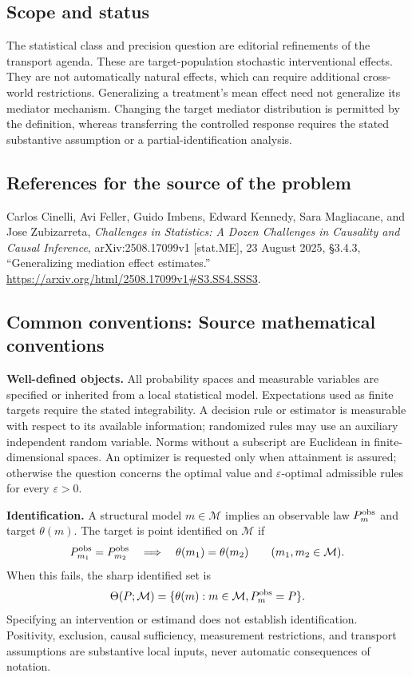\documentclass[11pt,a4paper]{article}
\begin{document}
\subsection*{Scope and status}
The statistical class and precision question are editorial refinements of the transport agenda. These are target-population stochastic interventional effects. They are not automatically natural effects, which can require additional cross-world restrictions. Generalizing a treatment's mean effect need not generalize its mediator mechanism. Changing the target mediator distribution is permitted by the definition, whereas transferring the controlled response requires the stated substantive assumption or a partial-identification analysis.
\subsection*{References for the source of the problem}
Carlos Cinelli, Avi Feller, Guido Imbens, Edward Kennedy, Sara Magliacane, and Jose Zubizarreta, \emph{Challenges in Statistics: A Dozen Challenges in Causality and Causal Inference}, arXiv:2508.17099v1 [stat.ME], 23 August 2025, \S3.4.3, ``Generalizing mediation effect estimates.'' \url{https://arxiv.org/html/2508.17099v1#S3.SS4.SSS3}.

\subsection*{Common conventions: Source mathematical conventions}

\textbf{Well-defined objects.}
All probability spaces and measurable variables are specified or inherited
from a local statistical model. Expectations used as finite targets require
the stated integrability. A decision rule or estimator is measurable with
respect to its available information; randomized rules may use an auxiliary
independent random variable. Norms without a subscript are Euclidean in
finite-dimensional spaces. An optimizer is requested only when attainment
is assured; otherwise the question concerns the optimal value and
$\varepsilon$-optimal admissible rules for every $\varepsilon>0$.

\textbf{Identification.}
A structural model $m\in\mathcal M$ implies an observable law
$P_m^{\rm obs}$ and target $\theta(m)$. The target is point identified on
$\mathcal M$ if
\[
 P_{m_1}^{\rm obs}=P_{m_2}^{\rm obs}
 \quad\Longrightarrow\quad\theta(m_1)=\theta(m_2)
 \qquad(m_1,m_2\in\mathcal M).
\]
When this fails, the sharp identified set is
\[
 \Theta(P;\mathcal M)=\{\theta(m):m\in\mathcal M,
                                  P_m^{\rm obs}=P\}.
\]
Specifying an intervention or estimand does not establish identification.
Positivity, exclusion, causal sufficiency, measurement restrictions, and
transport assumptions are substantive local inputs, never automatic
consequences of notation.
\end{document}
